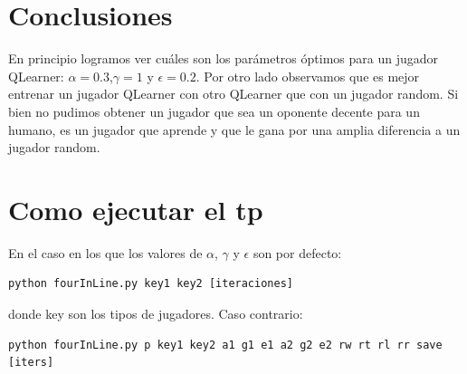 \documentclass[10pt, a4paper]{article}
\begin{document}
\section{Conclusiones}
En principio logramos ver cuáles son los parámetros óptimos para un jugador QLearner: $\alpha=0.3$,$\gamma=1$ y $\epsilon=0.2$.
Por otro lado observamos que es mejor entrenar un jugador QLearner con otro QLearner que con un jugador random.
Si bien no pudimos obtener un jugador que sea un oponente decente para un humano, es un jugador que aprende y que le gana por una amplia diferencia a un jugador random.


\section{Como ejecutar el tp}


En el caso en los que los valores de $\alpha$, $\gamma$ y $\epsilon$ son por defecto:
\begin{lstlisting}
python fourInLine.py key1 key2 [iteraciones]  
\end{lstlisting}
donde key son los tipos de jugadores. Caso contrario: \\
\begin{lstlisting}
python fourInLine.py p key1 key2 a1 g1 e1 a2 g2 e2 rw rt rl rr save [iters]
\end{lstlisting}
\end{document}
